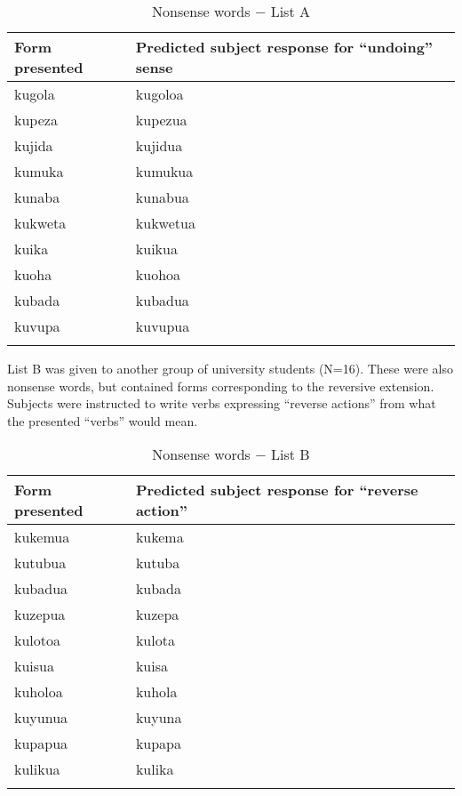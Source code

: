 \documentclass[output=paper]{langsci/langscibook}
\begin{document}
\begin{table}
\begin{tabularx}{.66\textwidth}{lX}
\lsptoprule
 Form presented &  Predicted subject response for   “undoing” sense\\
\midrule
  {kugola} &  {kugoloa}\\
 {kupeza} &  {kupezua}\\
 {kujida} &  {kujidua}\\
 {kumuka} &  {kumukua}\\
 {kunaba} &  {kunabua}\\
 {kukweta} &  {kukwetua}\\ 
 {kuika} &  {kuikua}\\
  {kuoha} &  {kuohoa}\\
  {kubada} &  {kubadua}\\
  {kuvupa} &  {kuvupua}\\
\lspbottomrule
\end{tabularx}
\caption{Nonsense words $-$ List A}
\label{tab:ngonyaningowa:1}
\end{table}

List B  was given to another group of university students (N=16). These were also nonsense words, but contained forms corresponding to the reversive extension. Subjects were instructed to write verbs expressing “reverse actions” from what the presented “verbs” would mean.

\begin{table}
\begin{tabularx}{.66\textwidth}{lX}
\lsptoprule
Form presented & Predicted subject response for  “reverse action”\\
\midrule
{kukemua} & {kukema}\\
{kutubua} & {kutuba}\\
{kubadua} & {kubada}\\
{kuzepua} & {kuzepa}\\
{kulotoa} & {kulota}\\
{kuisua} & {kuisa}\\
{kuholoa} & {kuhola}\\
{kuyunua} & {kuyuna}\\
{kupapua} & {kupapa}\\
{kulikua} & {kulika}\\
\lspbottomrule
\end{tabularx}
\caption{Nonsense words $-$ List B}
\label{tab:ngonyaningowa:2}
\end{table}
\end{document}
